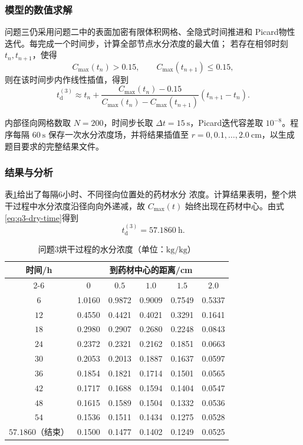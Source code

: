 \documentclass[12pt,a4paper]{article}
\renewcommand{\boxed}[1]{#1}
\begin{document}
\begin{center}
\subsubsection{模型的数值求解}

问题三仍采用问题二中的表面加密有限体积网格、全隐式时间推进和
Picard物性迭代。每完成一个时间步，计算全部节点水分浓度的最大值；
若存在相邻时刻 $t_n,t_{n+1}$，使得
\begin{equation}
C_{\max}(t_n)>0.15,\qquad
C_{\max}(t_{n+1})\leq0.15,
\end{equation}
则在该时间步内作线性插值，得到
\begin{equation}
t_{\mathrm d}^{(3)}
\approx t_n+
\frac{C_{\max}(t_n)-0.15}
{C_{\max}(t_n)-C_{\max}(t_{n+1})}
(t_{n+1}-t_n).
\label{eq:q3-time-interpolation}
\end{equation}

内部径向网格数取 $N=200$，时间步长取
$\Delta t=15\ \mathrm{s}$，Picard迭代容差取 $10^{-8}$。程序每隔
$60\ \mathrm{s}$ 保存一次水分浓度场，并将结果插值至
$r=0,0.1,\ldots,2.0\ \mathrm{cm}$，以生成题目要求的完整结果文件。

\subsubsection{结果与分析}

表\ref{tab:q3-moisture}给出了每隔6小时、不同径向位置处的药材水分
浓度。计算结果表明，整个烘干过程中水分浓度沿径向向外递减，故
$C_{\max}(t)$ 始终出现在药材中心。由式\eqref{eq:q3-dry-time}得到
\begin{equation}
\boxed{t_{\mathrm d}^{(3)}=57.1860\ \mathrm{h}}.
\label{eq:q3-result-time}
\end{equation}

\begin{table}[H]
\centering
\caption{问题3烘干过程的水分浓度（单位：$\mathrm{kg/kg}$）}
\label{tab:q3-moisture}
\begin{tabular}{cccccc}
\toprule
\multirow{2}{*}{时间/h}
& \multicolumn{5}{c}{到药材中心的距离/cm}\\
\cmidrule(lr){2-6}
& $0$ & $0.5$ & $1.0$ & $1.5$ & $2.0$\\
\midrule
$6$  & 1.0160 & 0.9872 & 0.9009 & 0.7549 & 0.5337\\
$12$ & 0.4550 & 0.4421 & 0.4021 & 0.3291 & 0.1641\\
$18$ & 0.2980 & 0.2907 & 0.2680 & 0.2248 & 0.0843\\
$24$ & 0.2372 & 0.2321 & 0.2162 & 0.1851 & 0.0663\\
$30$ & 0.2053 & 0.2013 & 0.1887 & 0.1637 & 0.0597\\
$36$ & 0.1854 & 0.1821 & 0.1714 & 0.1501 & 0.0565\\
$42$ & 0.1717 & 0.1688 & 0.1594 & 0.1404 & 0.0547\\
$48$ & 0.1615 & 0.1589 & 0.1504 & 0.1332 & 0.0536\\
$54$ & 0.1536 & 0.1511 & 0.1434 & 0.1275 & 0.0528\\
$57.1860$（结束） & 0.1500 & 0.1477 & 0.1402 & 0.1249 & 0.0525\\
\bottomrule
\end{tabular}
\end{table}


\end{center}
\end{document}
